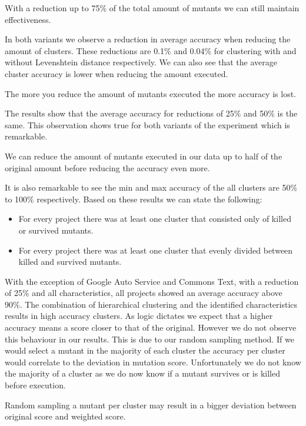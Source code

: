 \documentclass[../main]{subfiles}
\begin{document}
\begin{finding}
    With a reduction up to 75\% of the total amount of mutants we can still maintain effectiveness.
\end{finding}
In both variants we observe a reduction in average accuracy when reducing the amount of clusters.
These reductions are 0.1\% and 0.04\% for clustering with and without Levenshtein distance respectively.
We can also see that the average cluster accuracy is lower when reducing the amount executed.
\begin{finding}
    The more you reduce the amount of mutants executed the more accuracy is lost.
\end{finding}
The results show that the average accuracy for reductions of 25\% and 50\% is the same.
This observation shows true for both variants of the experiment which is remarkable.
\begin{finding}
    We can reduce the amount of mutants executed in our data up to half of the original amount before reducing the accuracy even more.
\end{finding}
It is also remarkable to see the min and max accuracy of the all clusters are 50\% to 100\% respectively.
Based on these results we can state the following:
\begin{itemize}
    \item For every project there was at least one cluster that consisted only of killed or survived mutants.
    \item For every project there was at least one cluster that evenly divided between killed and survived mutants.
\end{itemize}
With the exception of Google Auto Service and Commons Text, with a reduction of 25\% and all characteristics, all projects showed an average accuracy above 90\%.
The combination of hierarchical clustering and the identified characteristics results in high accuracy clusters.
As logic dictates we expect that a higher accuracy means a score closer to that of the original.
However we do not observe this behaviour in our results.
This is due to our random sampling method.
If we would select a mutant in the majority of each cluster the accuracy per cluster would correlate to the deviation in mutation score.
Unfortunately we do not know the majority of a cluster as we do now know if a mutant survives or is killed before execution.
\begin{finding}
    Random sampling a mutant per cluster may result in a bigger deviation between original score and weighted score.
\end{finding}
\end{document}
